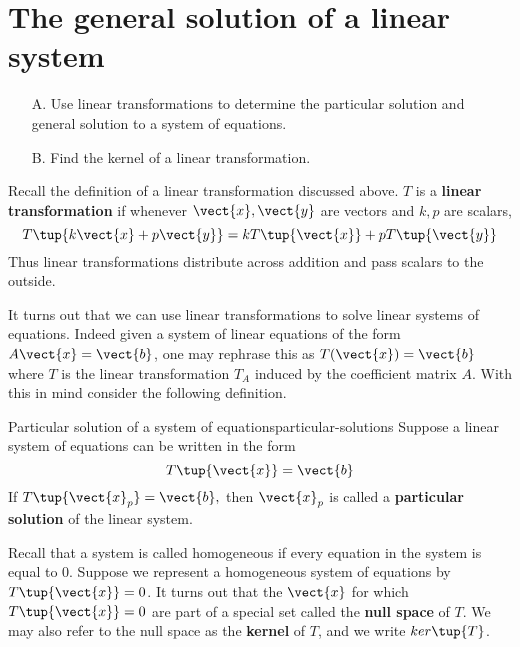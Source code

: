 \section{The general solution of a linear system}

\begin{outcome}
\begin{enumerate}
\item[A.]  Use linear transformations to determine the particular solution and general solution to a system of equations.

\item[B.]  Find the kernel of a linear transformation. 
\end{enumerate}
\end{outcome}

Recall the definition of a linear transformation discussed above. 
$T$ is a \textbf{linear transformation} if whenever $\vect{x}, \vect{y}$ are
vectors and $k,p$ are scalars,
\begin{equation*}
T\tup{k\vect{x}+p\vect{y}} =k T \tup{\vect{x} } +p T\tup{\vect{y} }
\end{equation*}
Thus linear transformations distribute across addition and pass scalars to
the outside.

It turns out that we can use linear transformations to solve linear
systems of equations. Indeed given a system of linear equations of the
form $A\vect{x}=\vect{b}$, one may rephrase this as $T(\vect{x})=\vect{b}$ where $T$ is the linear
transformation $T_A$ induced by the coefficient matrix $A$. With this in mind consider the following definition. 

\begin{definition}{Particular solution of a system of equations}{particular-solutions}
Suppose a linear system of equations can be written in the form
\begin{equation*}
T\tup{\vect{x}}=\vect{b}
\end{equation*}
If $T\tup{\vect{x}_{p}}=\vect{b},$ 
then $\vect{x}_{p}$ is called a \textbf{particular solution} of
the linear system.
\end{definition}

Recall that a system is called homogeneous if every equation in the system is equal to $0$. 
Suppose we represent a homogeneous system of equations by $T\tup{\vect{x}}=0$. It turns out
that the $\vect{x}$ for which $T \tup{\vect{x}} = 0$ are part of a special set called the \textbf{null space}
of $T$. We may also refer to the null space as the \textbf{kernel} of $T$, and we write $ker\tup{T}$. 

